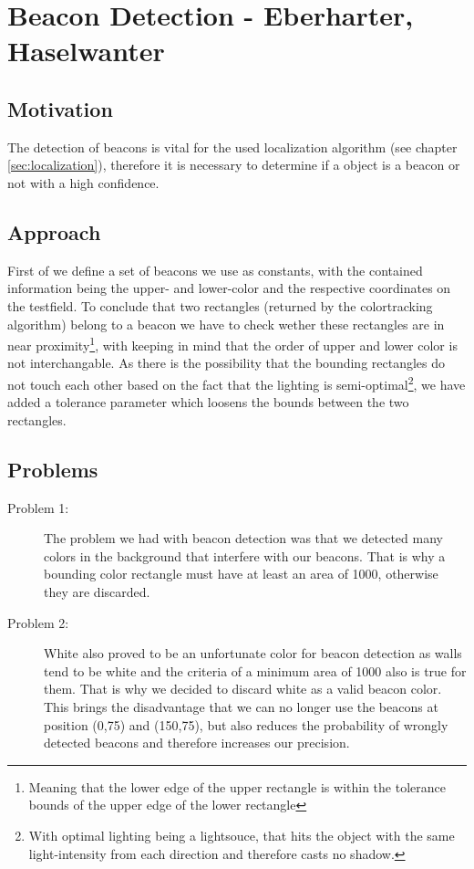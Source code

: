 \documentclass[703031]{iisreport}
\begin{document}
\section{Beacon Detection - Eberharter, Haselwanter}
\subsection{Motivation}
The detection of beacons is vital for the used localization algorithm (see chapter \ref{sec:localization}), therefore it is necessary to determine if a object is a beacon or not with a high confidence.

\subsection{Approach}
First of we define a set of beacons we use as constants, with the contained information being the upper- and lower-color and the respective coordinates on the testfield. To conclude that two rectangles (returned by the colortracking algorithm) belong to a beacon we have to check wether these rectangles are in near proximity\footnote{Meaning that the lower edge of the upper rectangle is within the tolerance bounds of the upper edge of the lower rectangle}, with keeping in mind that the order of upper and lower color is not interchangable. 
As there is the possibility that the bounding rectangles do not touch each other based on the fact that the lighting is semi-optimal\footnote{With optimal lighting being a lightsouce, that hits the object with the same light-intensity from each direction and therefore casts no shadow.}, we have added a tolerance parameter which loosens the bounds between the two rectangles.

\subsection{Problems}
	\begin{description}
		\item [Problem 1:] The problem we had with beacon detection was that we detected many colors in the background that interfere with our beacons. That is why a bounding color rectangle must have at least an area of 1000, otherwise they are discarded.
		\item [Problem 2:] White also proved to be an unfortunate color for beacon detection as walls tend to be white and the criteria of a minimum area of 1000 also is true for them. That is why we decided to discard white as a valid beacon color. This brings the disadvantage that we can no longer use the beacons at position (0,75) and (150,75), but also reduces the probability of wrongly detected beacons and therefore increases our precision.
	\end{description}
\end{document}
